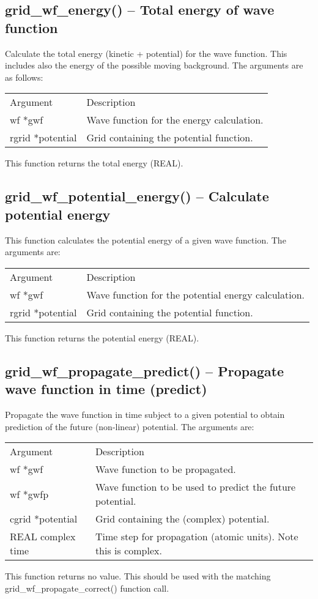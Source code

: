 \documentclass[12pt,letterpaper]{report}
\begin{document}
\subsection{grid\_wf\_energy() -- Total energy of wave function}

Calculate the total energy (kinetic + potential) for the wave function. This includes also the energy of the possible moving background. The arguments are as follows:
\begin{longtable}{p{} p{}}
Argument & Description\\
\cline{1-2}
wf *gwf & Wave function for the energy calculation.\\
rgrid *potential & Grid containing the potential function.\\
\end{longtable}
\noindent
This function returns the total energy (REAL).

\subsection{grid\_wf\_potential\_energy() -- Calculate potential energy}

This function calculates the potential energy of a given wave function. The arguments are:
\begin{longtable}{p{} p{}}
Argument & Description\\
\cline{1-2}
wf *gwf & Wave function for the potential energy calculation.\\
rgrid *potential & Grid containing the potential function.\\
\end{longtable}
\noindent
This function returns the potential energy (REAL).

\subsection{grid\_wf\_propagate\_predict() -- Propagate wave function in time (predict)}

Propagate the wave function in time subject to a given potential to obtain prediction of the future (non-linear) potential. The arguments are:
\begin{longtable}{p{} p{}}
Argument & Description\\
\cline{1-2}
wf *gwf & Wave function to be propagated.\\
wf *gwfp & Wave function to be used to predict the future potential.\\
cgrid *potential & Grid containing the (complex) potential.\\
REAL complex time & Time step for propagation (atomic units). Note this is complex.\\
\end{longtable}
\noindent
This function returns no value. This should be used with the matching grid\_wf\_propagate\_correct() function call.
\end{document}
